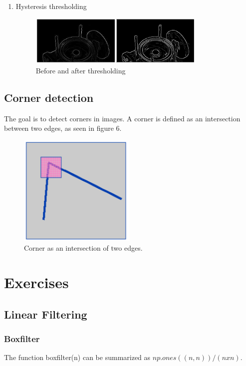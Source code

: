 \documentclass[12pt]{article}
\begin{document}
\begin{enumerate}
    \item Hysteresis thresholding
    \begin{figure}[!htb]
        \centering
        \includegraphics[width=0.8\textwidth]{pics/canny4}
        \caption{Before and after thresholding}
        \label{fig:thresholding}
    \end{figure}

    \end{enumerate}

\pagebreak
\subsection{Corner detection}
The goal is to detect corners in images. A corner is defined as an intersection
between two edges, as seen in figure 6.
    \begin{figure}[!htb]
        \centering
        \includegraphics[width=0.5\textwidth]{pics/wellDefinedCorner}
        \caption{Corner as an intersection of two edges.}
        \label{fig:corners}
    \end{figure}

\section{Exercises}
\subsection{Linear Filtering}
\subsubsection{Boxfilter}
The function boxfilter(n) can be summarized as $np.ones((n, n)) / (n x n)$.
\end{document}
